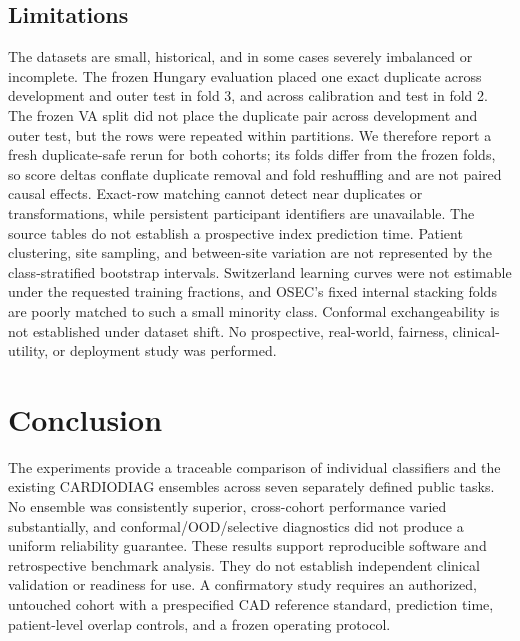\documentclass[conference]{IEEEtran}
\begin{document}
\subsection{Limitations}
The datasets are small, historical, and in some cases severely imbalanced or incomplete. The frozen Hungary evaluation placed one exact duplicate across development and outer test in fold 3, and across calibration and test in fold 2. The frozen VA split did not place the duplicate pair across development and outer test, but the rows were repeated within partitions. We therefore report a fresh duplicate-safe rerun for both cohorts; its folds differ from the frozen folds, so score deltas conflate duplicate removal and fold reshuffling and are not paired causal effects. Exact-row matching cannot detect near duplicates or transformations, while persistent participant identifiers are unavailable. The source tables do not establish a prospective index prediction time. Patient clustering, site sampling, and between-site variation are not represented by the class-stratified bootstrap intervals. Switzerland learning curves were not estimable under the requested training fractions, and OSEC's fixed internal stacking folds are poorly matched to such a small minority class. Conformal exchangeability is not established under dataset shift. No prospective, real-world, fairness, clinical-utility, or deployment study was performed.

\section{Conclusion}
The experiments provide a traceable comparison of individual classifiers and the existing CARDIODIAG ensembles across seven separately defined public tasks. No ensemble was consistently superior, cross-cohort performance varied substantially, and conformal/OOD/selective diagnostics did not produce a uniform reliability guarantee. These results support reproducible software and retrospective benchmark analysis. They do not establish independent clinical validation or readiness for use. A confirmatory study requires an authorized, untouched cohort with a prespecified CAD reference standard, prediction time, patient-level overlap controls, and a frozen operating protocol.
\end{document}
